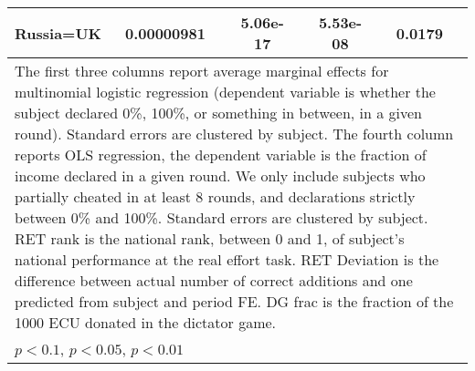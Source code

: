 \begin{tabular}{l|cccccc|cc}
Russia=UK       &0.00000981         &         & 5.06e-17         &         & 5.53e-08         &         &   0.0179         &         \\
\hline\hline
\multicolumn{9}{p{16cm}}{\tiny The first three columns report average marginal effects for multinomial logistic regression (dependent variable is whether the subject declared 0\%, 100\%, or something in between, in a given round). Standard errors are clustered by subject. The fourth column reports OLS regression, the dependent variable is the fraction of income declared in a given round. We only include subjects who partially cheated in at least 8 rounds, and declarations strictly between 0\% and 100\%. Standard errors are clustered by subject. RET rank is the national rank, between 0 and 1, of subject's national performance at the real effort task. RET Deviation is the difference between actual number of correct additions and one predicted from subject and period FE. DG frac is the fraction of the 1000 ECU donated in the dictator game.}\\
\multicolumn{9}{l}{\tiny \sym{*} \(p<0.1\), \sym{**} \(p<0.05\), \sym{***} \(p<0.01\)}\\
\end{tabular}